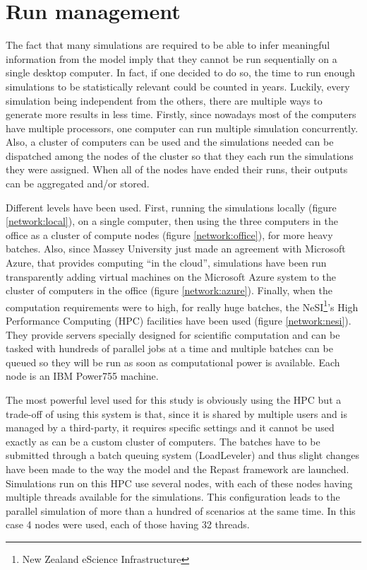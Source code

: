 \documentclass[a4paper,12pt]{report}
\begin{document}
\section{Run management}
The fact that many simulations are required to be able to infer meaningful information from the model imply that they cannot be run sequentially on a single desktop computer. In fact, if one decided to do so, the time to run enough simulations to be statistically relevant could be counted in years.
Luckily, every simulation being independent from the others, there are multiple ways to generate more results in less time.
Firstly, since nowadays most of the computers have multiple processors, one computer can run multiple simulation concurrently. Also, a cluster of computers can be used and the simulations needed can be dispatched among the nodes of the cluster so that they each run the simulations they were assigned. When all of the nodes have ended their runs, their outputs can be aggregated and/or stored.

Different levels have been used. First, running the simulations locally (figure \ref{network:local}), on a single computer, then using the three computers in the office as a cluster of compute nodes (figure \ref{network:office}), for more heavy batches. Also, since Massey University just made an agreement with Microsoft Azure, that provides computing “in the cloud”, simulations have been run transparently adding virtual machines on the Microsoft Azure system to the cluster of computers in the office (figure \ref{network:azure}).
Finally, when the computation requirements were to high, for really huge batches, the NeSI\footnote{New Zealand eScience Infrastructure}’s High Performance Computing (HPC) facilities have been used (figure \ref{network:nesi}). They provide servers specially designed for scientific computation and can be tasked with hundreds of parallel jobs at a time and multiple batches can be queued so they will be run as soon as computational power is available. Each node is an IBM Power755 machine.

The most powerful level used for this study is obviously using the HPC but a trade-off of using this system is that, since it is shared by multiple users and is managed by a third-party, it requires specific settings and it cannot be used exactly as can be a custom cluster of computers. The batches have to be submitted through a batch queuing system (LoadLeveler) and thus slight changes have been made to the way the model and the Repast framework are launched. Simulations run on this HPC use several nodes, with each of these nodes having multiple threads available for the simulations. This configuration leads to the parallel simulation of more than a hundred of scenarios at the same time. In this case 4 nodes were used, each of those having 32 threads.
\end{document}
